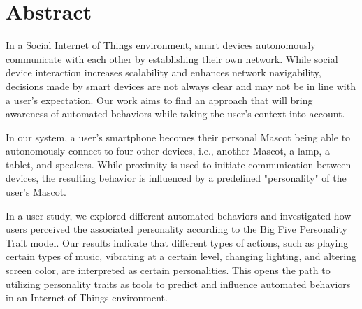 ﻿\section*{Abstract}
In a Social Internet of Things environment, smart devices autonomously
communicate with each other by establishing their own network.
While social device interaction increases scalability and enhances network navigability,
decisions made by smart devices are not always clear and may not be in line with a user's expectation.
Our work aims to find an approach that will bring awareness of automated behaviors
while taking the user's context into account.

In our system, a user's smartphone becomes their personal Mascot being able to autonomously
connect to four other devices, i.e., another Mascot, a lamp, a tablet, and speakers.
While proximity is used to initiate communication between devices, the resulting
behavior is influenced by a predefined "personality" of the user's Mascot.

In a user study, we explored different automated behaviors and investigated how users
perceived the associated personality according to the Big Five Personality Trait model.
Our results indicate that different types of actions, such as playing certain types of music,
vibrating at a certain level, changing lighting, and altering screen color, are interpreted as certain personalities.
This opens the path to utilizing personality traits as tools to predict and influence
automated behaviors in an Internet of Things environment.